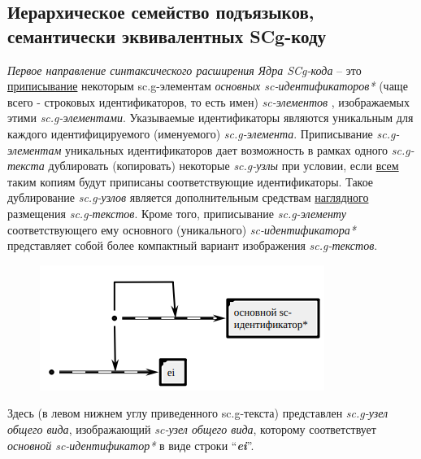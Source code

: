 \subsection{Иерархическое семейство подъязыков, семантически эквивалентных SCg-коду}

\begin{SCn}
\end{SCn}
	
\textit{Первое направление синтаксического расширения Ядра SCg-кода} -- это \uline{приписывание} некоторым \mbox{sc.g-элементам} \textit{основных sc-идентификаторов*} (чаще всего - строковых идентификаторов, то есть имен) \textit{sc-элементов} , изображаемых этими \textit{sc.g-элементами}. Указываемые идентификаторы являются уникальным для каждого идентифицируемого (именуемого) \textit{sc.g-элемента}. Приписывание \textit{sc.g-элементам} уникальных идентификаторов дает возможность в рамках одного \textit{sc.g-текста} дублировать (копировать) некоторые \textit{sc.g-узлы} при условии, если \uline{всем} таким копиям будут приписаны соответствующие идентификаторы. Такое дублирование \textit{sc.g-узлов} является дополнительным средствам \uline{наглядного} размещения \textit{sc.g-текстов}. Кроме того, приписывание \textit{sc.g-элементу} соответствующего ему основного (уникального) \textit{sc-идентификатора*} представляет собой более компактный вариант изображения \textit{sc.g-текстов}.

\begin{figure}[h]
	\centering
	\includegraphics[scale=0.8]{images/intro/scg/scg_transf1.png}
\end{figure}

Здесь (в левом нижнем углу приведенного sc.g-текста) представлен \textit{sc.g-узел общего вида}, изображающий \textit{sc-узел общего вида}, которому соответствует \textit{основной sc-идентификатор*} в виде строки ``\textbf{\textit{ei}}''.


